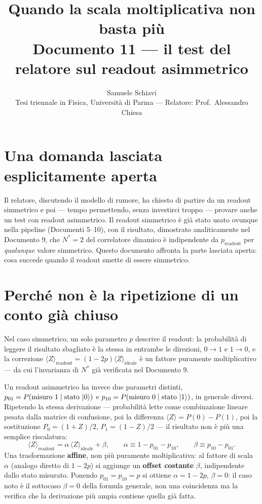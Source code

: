 \documentclass[11pt,a4paper]{article}
\title{\bfseries Quando la scala moltiplicativa non basta più\\[2pt]
\large Documento 11 --- il test del relatore sul readout asimmetrico}
\author{Samuele Schiavi \\ \small Tesi triennale in Fisica, Università di Parma
--- Relatore: Prof.\ Alessandro Chiesa}
\date{}
\begin{document}
\maketitle
\thispagestyle{fancy}

\section{Una domanda lasciata esplicitamente aperta}

Il relatore, discutendo il modello di rumore, ha chiesto di partire da un
readout simmetrico e poi --- tempo permettendo, senza investirci troppo ---
provare anche un test con readout asimmetrico. Il readout simmetrico è già
stato usato ovunque nella pipeline (Documenti 5--10), con il risultato,
dimostrato analiticamente nel Documento 9, che $N^*=2$ del correlatore
dinamico è indipendente da $p_\text{readout}$ per \emph{qualunque} valore
simmetrico. Questo documento affronta la parte lasciata aperta: cosa succede
quando il readout smette di essere simmetrico.

\section{Perché non è la ripetizione di un conto già chiuso}

Nel caso simmetrico, un solo parametro $p$ descrive il readout: la
probabilità di leggere il risultato sbagliato è la stessa in entrambe le
direzioni, $0\to1$ e $1\to0$, e la correzione $\langle
Z\rangle_\text{readout}=(1-2p)\langle Z\rangle_\text{ideale}$ è un fattore
puramente moltiplicativo --- da cui l'invarianza di $N^*$ già verificata nel
Documento 9.

Un readout asimmetrico ha invece due parametri distinti,
$p_{01}=P(\text{misuro }1\mid\text{stato }\lvert 0\rangle)$ e
$p_{10}=P(\text{misuro }0\mid\text{stato }\lvert 1\rangle)$, in generale diversi.
Ripetendo la stessa derivazione --- probabilità lette come combinazione
lineare pesata dalla matrice di confusione, poi la differenza
$\langle Z\rangle=P(0)-P(1)$, poi la sostituzione $P_0=(1+Z)/2$,
$P_1=(1-Z)/2$ --- il risultato non è più una semplice riscalatura:
\begin{equation}
\langle Z\rangle_\text{readout} = \alpha\,\langle Z\rangle_\text{ideale} + \beta,
\qquad \alpha \equiv 1-p_{01}-p_{10}, \qquad \beta \equiv p_{10}-p_{01}.
\label{eq:formula-generale}
\end{equation}
Una trasformazione \textbf{affine}, non più puramente moltiplicativa: al
fattore di scala $\alpha$ (analogo diretto di $1-2p$) si aggiunge un
\textbf{offset costante} $\beta$, indipendente dallo stato misurato. Ponendo
$p_{01}=p_{10}=p$ si ottiene $\alpha=1-2p$, $\beta=0$: il caso noto è il
sottocaso $\beta=0$ della formula generale, non una coincidenza ma la verifica
che la derivazione più ampia contiene quella già fatta.
\end{document}
